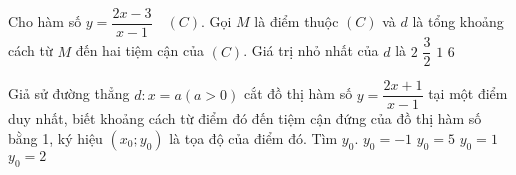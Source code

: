 \begin{ex}%
	Cho hàm số $y=\dfrac{2x-3}{x-1}\quad(C)$. Gọi $M$ là điểm thuộc $(C)$ và $d$ là tổng khoảng cách từ $M$ đến hai tiệm cận của $(C)$. Giá trị nhỏ nhất của $d$ là
	\choice
	{\True $2$}
	{$\dfrac{3}{2}$}
	{$1$}
	{$6$}
\end{ex}
\begin{ex}%
	Giả sử đường thẳng $d\colon x=a(a>0)$ cắt đồ thị hàm số $y=\dfrac{2x+1}{x-1}$ tại một điểm duy nhất, biết khoảng cách từ điểm đó đến tiệm cận đứng của đồ thị hàm số bằng 1, ký hiệu $(x_0;y_0)$ là tọa độ của điểm đó. Tìm $y_0$. 
	\choice
	{$y_0=-1$}
	{\True $y_0=5$}
	{$y_0=1$}
	{$y_0=2$}
\end{ex}

